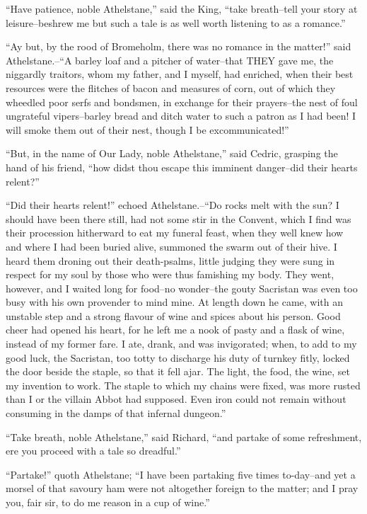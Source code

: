 ``Have patience, noble Athelstane,'' said the King, ``take breath--tell
your story at leisure--beshrew me but such a tale is as well worth
listening to as a romance.''

``Ay but, by the rood of Bromeholm, there was no romance in the
matter!'' said Athelstane.--``A barley loaf and a pitcher of water--that
THEY gave me, the niggardly traitors, whom my father, and I myself, had
enriched, when their best resources were the flitches of bacon and
measures of corn, out of which they wheedled poor serfs and bondsmen, in
exchange for their prayers--the nest of foul ungrateful vipers--barley
bread and ditch water to such a patron as I had been! I will smoke them
out of their nest, though I be excommunicated!''

``But, in the name of Our Lady, noble Athelstane,'' said Cedric,
grasping the hand of his friend, ``how didst thou escape this imminent
danger--did their hearts relent?''

``Did their hearts relent!'' echoed Athelstane.--``Do rocks melt with
the sun? I should have been there still, had not some stir in the
Convent, which I find was their procession hitherward to eat my funeral
feast, when they well knew how and where I had been buried alive,
summoned the swarm out of their hive. I heard them droning out their
death-psalms, little judging they were sung in respect for my soul by
those who were thus famishing my body. They went, however, and I waited
long for food--no wonder--the gouty Sacristan was even too busy with his
own provender to mind mine. At length down he came, with an unstable
step and a strong flavour of wine and spices about his person. Good
cheer had opened his heart, for he left me a nook of pasty and a flask
of wine, instead of my former fare. I ate, drank, and was invigorated;
when, to add to my good luck, the Sacristan, too totty to discharge his
duty of turnkey fitly, locked the door beside the staple, so that it
fell ajar. The light, the food, the wine, set my invention to work. The
staple to which my chains were fixed, was more rusted than I or the
villain Abbot had supposed. Even iron could not remain without consuming
in the damps of that infernal dungeon.''

``Take breath, noble Athelstane,'' said Richard, ``and partake of some
refreshment, ere you proceed with a tale so dreadful.''

``Partake!'' quoth Athelstane; ``I have been partaking five times
to-day--and yet a morsel of that savoury ham were not altogether foreign
to the matter; and I pray you, fair sir, to do me reason in a cup of
wine.''


